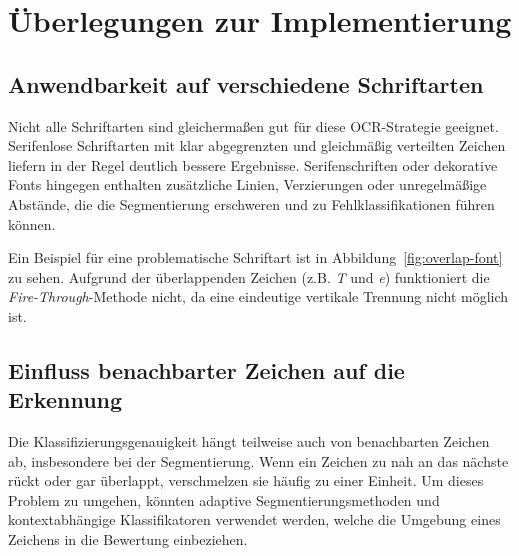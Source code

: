 \section{Überlegungen zur Implementierung}

\subsection{Anwendbarkeit auf verschiedene Schriftarten}


Nicht alle Schriftarten sind gleichermaßen gut für diese OCR-Strategie geeignet. Serifenlose Schriftarten mit klar abgegrenzten und gleichmäßig verteilten Zeichen liefern in der Regel deutlich bessere Ergebnisse. Serifenschriften oder dekorative Fonts hingegen enthalten zusätzliche Linien, Verzierungen oder unregelmäßige Abstände, die die Segmentierung erschweren und zu Fehlklassifikationen führen können.

Ein Beispiel für eine problematische Schriftart ist in Abbildung~\ref{fig:overlap-font} zu sehen. Aufgrund der überlappenden Zeichen (z.B. \textit{T} und \textit{e}) funktioniert die \textit{Fire-Through}-Methode nicht, da eine eindeutige vertikale Trennung nicht möglich ist.



\subsection{Einfluss benachbarter Zeichen auf die Erkennung}


Die Klassifizierungsgenauigkeit hängt teilweise auch von benachbarten Zeichen ab, insbesondere bei der Segmentierung. Wenn ein Zeichen zu nah an das nächste rückt oder gar überlappt, verschmelzen sie häufig zu einer Einheit. Um dieses Problem zu umgehen, könnten adaptive Segmentierungsmethoden und kontextabhängige Klassifikatoren verwendet werden, welche die Umgebung eines Zeichens in die Bewertung einbeziehen.



